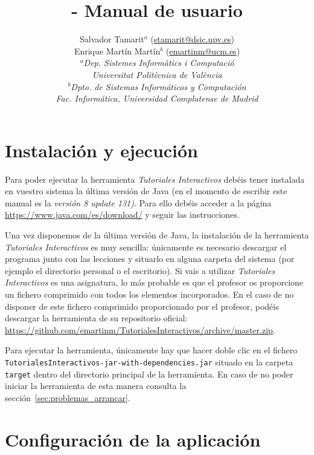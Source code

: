 \documentclass[]{article}
\title{\toolname{} - Manual de usuario}
\author{Salvador Tamarit$^a$ (\url{stamarit@dsic.upv.es}) \\
	Enrique Martín Martín$^b$ (\url{emartinm@ucm.es}) \\ 
	\normalsize{\emph{$^a$Dep. Sistemes Informàtics i Computació}}\\[-0.1cm]
	\normalsize{\emph{Universitat Politècnica de València}}\\[-0.1cm]
	\normalsize{\emph{$^b$Dpto. de Sistemas Informáticos y Computación}}\\[-0.1cm]
	\normalsize{\emph{Fac. Informática, Universidad Complutense de Madrid}}\\[-0.1cm]
}
\newcommand{\toolname}{\emph{Tutoriales Interactivos}}
\begin{document}
\maketitle

\tableofcontents

\clearpage

\section{Instalación y ejecución}

Para poder ejecutar la herramienta \toolname{} debéis tener instalada en vuestro sistema la última versión de Java (en el momento de escribir este manual es la \emph{versión 8 update 131)}. Para ello debéis acceder a la página \url{https://www.java.com/es/download/} y seguir las instrucciones.

Una vez disponemos de la última versión de Java, la instalación de la herramienta \toolname{} es muy sencilla: únicamente es necesario descargar el programa junto con las lecciones y situarlo en alguna carpeta del sistema (por ejemplo el directorio personal o el escritorio). Si vais a utilizar \toolname{} es una asignatura, lo más probable es que el profesor os proporcione un fichero comprimido con todos los elementos incorporados. En el caso de no disponer de este fichero comprimido proporcionado por el profesor, podéis descargar la herramienta de su repositorio oficial: \url{https://github.com/emartinm/TutorialesInteractivos/archive/master.zip}.

Para ejecutar la herramienta, únicamente hay que hacer doble clic en el fichero \texttt{TutorialesInteractivos-jar-with-dependencies.jar} situado en la carpeta \texttt{target} dentro del directorio principal de la herramienta. En caso de no poder iniciar la herramienta de esta manera consulta la sección~\ref{sec:problemas_arrancar}.

\section{Configuración de la aplicación}
\label{sec:configuracion}
\end{document}

